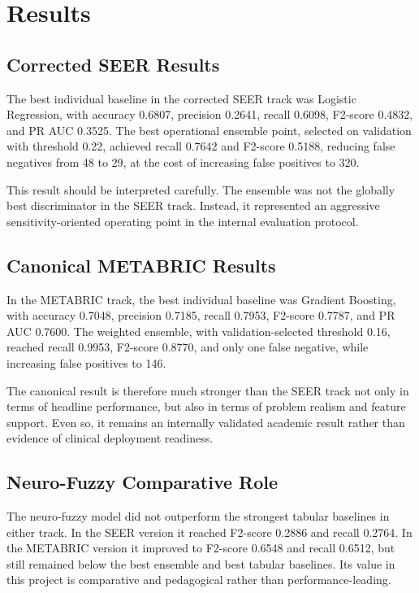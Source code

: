 \documentclass[conference]{IEEEtran}
\begin{document}
\section{Results}

\subsection{Corrected SEER Results}

The best individual baseline in the corrected SEER track was Logistic Regression, with accuracy 0.6807, precision 0.2641, recall 0.6098, F2-score 0.4832, and PR AUC 0.3525. The best operational ensemble point, selected on validation with threshold 0.22, achieved recall 0.7642 and F2-score 0.5188, reducing false negatives from 48 to 29, at the cost of increasing false positives to 320.

This result should be interpreted carefully. The ensemble was not the globally best discriminator in the SEER track. Instead, it represented an aggressive sensitivity-oriented operating point in the internal evaluation protocol.

\subsection{Canonical METABRIC Results}

In the METABRIC track, the best individual baseline was Gradient Boosting, with accuracy 0.7048, precision 0.7185, recall 0.7953, F2-score 0.7787, and PR AUC 0.7600. The weighted ensemble, with validation-selected threshold 0.16, reached recall 0.9953, F2-score 0.8770, and only one false negative, while increasing false positives to 146.

The canonical result is therefore much stronger than the SEER track not only in terms of headline performance, but also in terms of problem realism and feature support. Even so, it remains an internally validated academic result rather than evidence of clinical deployment readiness.

\subsection{Neuro-Fuzzy Comparative Role}

The neuro-fuzzy model did not outperform the strongest tabular baselines in either track. In the SEER version it reached F2-score 0.2886 and recall 0.2764. In the METABRIC version it improved to F2-score 0.6548 and recall 0.6512, but still remained below the best ensemble and best tabular baselines. Its value in this project is comparative and pedagogical rather than performance-leading.
\end{document}

